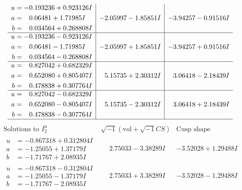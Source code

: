 \documentclass[1p]{elsarticle_modified}
\theoremstyle{definition}
\newcommand{\I}{\sqrt{-1}}
\begin{document}
$$\begin{array}{c|c|c}
\begin{aligned}
u &= -0.193236 + 0.923126 I \\
a &= \phantom{-}0.06481 + 1.71985 I \\
b &= \phantom{-}0.034564 + 0.268808 I\end{aligned}
 & -2.05997 - 1.85851 I & -3.94257 - 0.91516 I \\ \hline\begin{aligned}
u &= -0.193236 - 0.923126 I \\
a &= \phantom{-}0.06481 - 1.71985 I \\
b &= \phantom{-}0.034564 - 0.268808 I\end{aligned}
 & -2.05997 + 1.85851 I & -3.94257 + 0.91516 I \\ \hline\begin{aligned}
u &= \phantom{-}0.827042 + 0.682329 I \\
a &= \phantom{-}0.652080 + 0.805407 I \\
b &= \phantom{-}0.478838 + 0.307764 I\end{aligned}
 & \phantom{-}5.15735 + 2.30312 I & \phantom{-}3.06418 - 2.18439 I \\ \hline\begin{aligned}
u &= \phantom{-}0.827042 - 0.682329 I \\
a &= \phantom{-}0.652080 - 0.805407 I \\
b &= \phantom{-}0.478838 - 0.307764 I\end{aligned}
 & \phantom{-}5.15735 - 2.30312 I & \phantom{-}3.06418 + 2.18439 I\\
 \hline 
 \end{array}$$\newpage$$\begin{array}{c|c|c}  
\text{Solutions to }I^u_{2}& \I (\text{vol} + \sqrt{-1}CS) & \text{Cusp shape}\\
 \hline 
\begin{aligned}
u &= -0.867318 + 0.312804 I \\
a &= -1.25055 + 1.37179 I \\
b &= -1.71767 + 2.08935 I\end{aligned}
 & \phantom{-}2.75033 - 3.38289 I & -3.52028 + 1.29488 I \\ \hline\begin{aligned}
u &= -0.867318 - 0.312804 I \\
a &= -1.25055 - 1.37179 I \\
b &= -1.71767 - 2.08935 I\end{aligned}
 & \phantom{-}2.75033 + 3.38289 I & -3.52028 - 1.29488 I \\ \hline\begin{aligned}

\end{aligned}
\end{array}$$
\end{document}
